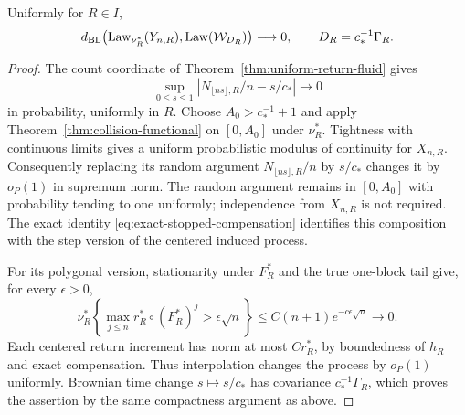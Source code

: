 \begin{theorem}
\label{thm:actual-return-functional}
Uniformly for $R\in I$,
\begin{equation}\label{eq:actual-return-functional}
 d_{\rm BL}\bigl(\operatorname{Law}_{\nu_R^*}(Y_{n,R}),
                         \operatorname{Law}(\mathcal W_{D_R})\bigr)
       \longrightarrow0,
       \qquad D_R=c_*^{-1}\Gamma_R.
\end{equation}
\end{theorem}
\begin{proof}
The count coordinate of Theorem~\ref{thm:uniform-return-fluid} gives
\[
 \sup_{0\le s\le1}|N_{\lfloor ns\rfloor,R}/n-s/c_*|
                  \longrightarrow0
\]
in probability, uniformly in $R$. Choose $A_0>c_*^{-1}+1$ and apply
Theorem~\ref{thm:collision-functional} on $[0,A_0]$ under $\nu_R^*$.
Tightness with continuous limits gives a uniform probabilistic modulus
of continuity for $X_{n,R}$. Consequently replacing its random argument
$N_{\lfloor ns\rfloor,R}/n$ by $s/c_*$ changes it by $o_P(1)$ in
supremum norm. The random argument remains in $[0,A_0]$ with probability
tending to one uniformly; independence from $X_{n,R}$ is not required.
The exact identity \eqref{eq:exact-stopped-compensation} identifies this
composition with the step version of the centered induced process.

For its polygonal version, stationarity under $F_R^*$ and the true
one-block tail give, for every $\epsilon>0$,
\[
 \nu_R^*\left\{\max_{j\le n}r_R^*\circ(F_R^*)^j>
                  \epsilon\sqrt n\right\}
       \le C(n+1)e^{-c\epsilon\sqrt n}\longrightarrow0.
\]
Each centered return increment has norm at most $C r_R^*$, by
boundedness of $h_R$ and exact compensation. Thus interpolation changes
the process by $o_P(1)$ uniformly. Brownian time change $s\mapsto s/c_*$
has covariance $c_*^{-1}\Gamma_R$, which proves the assertion by the
same compactness argument as above.
\end{proof}

